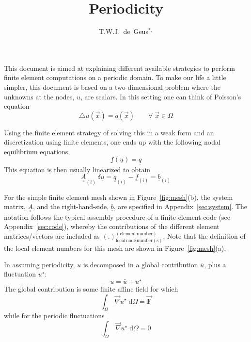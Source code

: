 \documentclass[times,namecite]{goose-article}
\title{%
  Periodicity
}
\author{T.W.J.~de~Geus$^{*,}$}
\newcommand{\Grad}{\vec{\nabla}}
\begin{document}
\maketitle

This document is aimed at explaining different available strategies to perform finite element computations on a periodic domain. To make our life a little simpler, this document is based on a two-dimensional problem where the unknowns at the nodes, $u$, are scalars. In this setting one can think of Poisson's equation
\begin{equation}
  \bigtriangleup u ( \vec{x} ) = q ( \vec{x} ) \qquad \forall \; \vec{x} \in \Omega
\end{equation}

Using the finite element strategy of solving this in a weak form and an discretization using finite elements, one ends up with the following nodal equilibrium equations
\begin{equation}
  \underline{f} ( \underline{u} ) = \underline{q}
\end{equation}
This equation is then usually linearized to obtain
\begin{equation} \label{eq:system}
  \underline{\underline{A}}_{(i)} \, \delta \underline{u}
  =
  \underline{q}_{(i)} - \underline{f}_{(i)}
  =
  \underline{b}_{(i)}
\end{equation}

For the simple finite element mesh shown in Figure~\ref{fig:mesh}(b), the system matrix, $\underline{\underline{A}}$, and the right-hand-side, $\underline{b}$, are specified in Appendix~\ref{sec:system}. The notation follows the typical assembly procedure of a finite element code (see Appendix~\ref{sec:code}), whereby the contributions of the different element matrices/vectors are included as $\left( . \right)^\mathrm{(element\, number)}_\mathrm{local\, node\, number(s)}$. Note that the definition of the local element numbers for this mesh are shown in Figure~\ref{fig:mesh}(a).

In assuming periodicity, $u$ is decomposed in a global contribution $\bar{u}$, plus a fluctuation $u^\star$:
\begin{equation}
  u = \bar{u} + u^\star
\end{equation}
The global contribution is some finite affine field for which
\begin{equation}
  \int_\Omega \, \Grad u^\star \;\mathrm{d}\Omega = \vec{\bm{F}}
\end{equation}
while for the periodic fluctuations
\begin{equation}
  \int_\Omega \, \Grad u^\star \;\mathrm{d}\Omega = 0
\end{equation}
\end{document}
